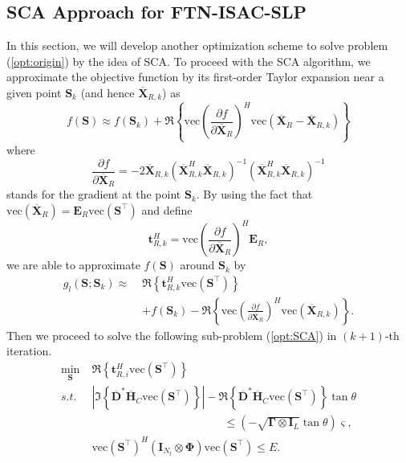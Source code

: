 \documentclass[lettersize,journal]{IEEEtran}
\begin{document}
\subsection{SCA Approach for FTN-ISAC-SLP}
In this section, we will develop another optimization scheme to solve problem (\ref{opt:origin}) by the idea of SCA. To proceed with the SCA algorithm, we approximate the objective function by its first-order Taylor expansion near a given point $\mathbf{S}_k$ (and hence $\overline{\mathbf{X}}_{R,k}$) as
\begin{equation}
    f(\mathbf{S}) \approx f(\mathbf{S}_k) + \Re\left\{\text{vec}\left(\frac{\partial f}{\partial \overline{\mathbf{X}}_R}\right)^{H}\text{vec}\left(\overline{\mathbf{X}}_R-\overline{\mathbf{X}}_{R,k}\right)\right\}
\end{equation}
where
\begin{equation}
\label{eq:gradient}
    \frac{\partial f}{\partial \overline{\mathbf{X}}_R} = -2\overline{\mathbf{X}}_{R,k}\left(\overline{\mathbf{X}}_{R,k}^{H}\overline{\mathbf{X}}_{R,k}\right)^{-1}\left(\overline{\mathbf{X}}_{R,k}^{H}\overline{\mathbf{X}}_{R,k}\right)^{-1}
\end{equation}
stands for the gradient at the point $\mathbf{S}_k$. By using the fact that $\text{vec}(\overline{\mathbf{X}}_R)=\mathbf{E}_R\text{vec}(\mathbf{S}^{\top})$ and define 
\begin{equation}
\label{eq:t_R}
    \mathbf{t}_{R,k}^{H} = \text{vec}\left(\frac{\partial f}{\partial \overline{\mathbf{X}}_R}\right)^{H}\mathbf{E}_R,
\end{equation}
we are able to approximate $f(\mathbf{S})$ around $\mathbf{S}_k$ by
\begin{equation}
\begin{aligned}
    g_l(\mathbf{S};\mathbf{S}_k) \approx \;&\Re\left\{\mathbf{t}_{R,k}^{H}\text{vec}(\mathbf{S}^{\top})\right\} \\
    &+ f(\mathbf{S}_k) - \Re\left\{\text{vec}\left(\frac{\partial f}{\partial \overline{\mathbf{X}}_R}\right)^{H}\text{vec}\left(\overline{\mathbf{X}}_{R,k}\right)\right\}.
\end{aligned}
\end{equation}
Then we proceed to solve the following sub-problem (\ref{opt:SCA}) in $(k+1)$-th iteration.
\begin{equation}
\label{opt:SCA}
\begin{aligned}
    \underset{\mathbf{S}}{\mathrm{min}} &\;
    \Re\left\{\mathbf{t}_{R,i}^{H}\text{vec}(\mathbf{S}^{\top})\right\} \\
    s.t. &\;
    \left| \Im\left\{\overline{\mathbf{D}}^{*}\overline{\mathbf{H}}_C\text{vec}(\mathbf{S}^{\top})\right\} \right| - \Re\left\{\overline{\mathbf{D}}^{*}\overline{\mathbf{H}}_C\text{vec}(\mathbf{S}^{\top})\right\}\tan\theta \\
    &\qquad\qquad\qquad\qquad\qquad\qquad
    \leq (-\sqrt{\mathbf{\Gamma}\otimes\mathbf{I}_L}\tan\theta)\bm{\varsigma}, \\
    &\; \text{vec}(\mathbf{S}^{\top})^H(\mathbf{I}_{N_t}\otimes\mathbf{\Phi})\text{vec}(\mathbf{S}^{\top})\leq E.
\end{aligned}
\end{equation}
\end{document}
